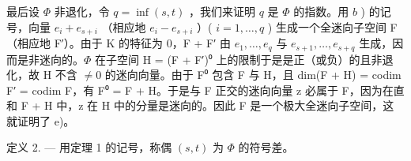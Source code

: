 最后设 \(\Phi\) 非退化，令 \(q = \inf (s, t)\) ，我们来证明 \(q\) 是 \(\Phi\) 的指数。用 \(b\) ) 的记号，向量 \(e_i + e_{s+i}\) （相应地 \(e_i - e_{s+i}\) ）( \(i = 1, \ldots, q\) ) 生成一个全迷向子空间 F（相应地 F′）。由于 K 的特征为 0，F + F′ 由 \(e_1, \ldots, e_q\) 与 \(e_{s+1}, \ldots, e_{s+q}\) 生成，因而是非迷向的。\(\Phi\) 在子空间 H = (F + F′)⁰ 上的限制于是是正（或负）的且非退化，故 H 不含 \(\neq 0\) 的迷向向量。由于 F⁰ 包含 F 与 H，且 dim(F + H) = codim F′ = codim F，有 F⁰ = F + H。于是与 F 正交的迷向向量 z 必属于 F，因为在直和 F + H 中，z 在 H 中的分量是迷向的。因此 F 是一个极大全迷向子空间，这就证明了 e)。

定义 2. --- 用定理 1 的记号，称偶 \((s,t)\) 为 \(\Phi\) 的符号差。

